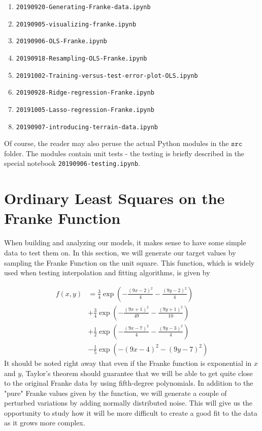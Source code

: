 \documentclass{article}
\begin{document}
\begin{enumerate}
    \item \texttt{20190920-Generating-Franke-data.ipynb}
    \item \texttt{20190905-visualizing-franke.ipynb}
    \item \texttt{20190906-OLS-Franke.ipynb}
    \item \texttt{20190918-Resampling-OLS-Franke.ipynb}
    \item \texttt{20191002-Training-versus-test-error-plot-OLS.ipynb}
    \item \texttt{20190928-Ridge-regression-Franke.ipynb}
    \item \texttt{20191005-Lasso-regression-Franke.ipynb}
    \item \texttt{20190907-introducing-terrain-data.ipynb}
\end{enumerate}

Of course, the reader may also peruse the actual Python modules in the $\texttt{src}$ folder. The modules contain unit tests - the testing is briefly described in the special notebook \texttt{20190906-testing.ipynb}.

\section{Ordinary Least Squares on the Franke Function}
When building and analyzing our models, it makes sense to have some simple data to test them on. In this section, we will generate our target values by sampling the Franke Function on the unit square. This function, which is widely used when testing interpolation and fitting algorithms, is given by

\begin{align*}
    f(x, y)
    &={\frac{3}{4}\exp\left(-{\frac{(9x-2)^2}{4}} -{\frac{(9y-2)^2}{4}}\right)}\\
    &+{\frac{3}{4}\exp\left(-{\frac{(9x+1)^2}{49}}-{\frac{(9y+1)^2}{10}}\right)}\\
    &+{\frac{1}{2}\exp\left(-{\frac{(9x-7)^2}{4}}-{\frac{(9y-3)^2}{4}}\right)}\\
    &-{\frac{1}{5}\exp\left(-{(9x-4)^2}-{(9y-7)^2}\right)}
\end{align*}
It should be noted right away that even if the Franke function is exponential in $x$ and $y$, Taylor's theorem should guarantee that we will be able to get quite close to the original Franke data by using fifth-degree polynomials. In addition to the "pure" Franke values given by the function, we will generate a couple of perturbed variations by adding normally distributed noise. This will give us the opportunity to study how it will be more difficult to create a good fit to the data as it grows more complex.
\end{document}
